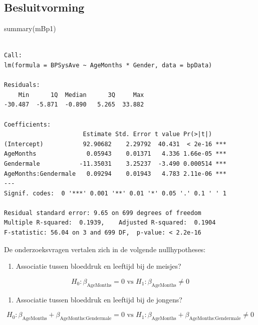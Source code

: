 \documentclass[
  dutch,
  letterpaper,
  12pt]{book}
\newenvironment{Shaded}{\begin{snugshade}}{\end{snugshade}}
\newcommand{\FunctionTok}[1]{\textcolor[rgb]{0.28,0.35,0.67}{#1}}
\newcommand{\NormalTok}[1]{\textcolor[rgb]{0.00,0.23,0.31}{#1}}
\providecommand{\tightlist}{%
  \setlength{\itemsep}{0pt}\setlength{\parskip}{0pt}}
\theoremstyle{definition}
\theoremstyle{definition}
\theoremstyle{definition}
\theoremstyle{remark}
\begin{document}
\subsection{Besluitvorming}\label{besluitvorming}

\begin{Shaded}
\begin{Highlighting}[]
\FunctionTok{summary}\NormalTok{(mBp1)}
\end{Highlighting}
\end{Shaded}

\begin{verbatim}

Call:
lm(formula = BPSysAve ~ AgeMonths * Gender, data = bpData)

Residuals:
    Min      1Q  Median      3Q     Max 
-30.487  -5.871  -0.890   5.265  33.882 

Coefficients:
                      Estimate Std. Error t value Pr(>|t|)    
(Intercept)           92.90682    2.29792  40.431  < 2e-16 ***
AgeMonths              0.05943    0.01371   4.336 1.66e-05 ***
Gendermale           -11.35031    3.25237  -3.490 0.000514 ***
AgeMonths:Gendermale   0.09294    0.01943   4.783 2.11e-06 ***
---
Signif. codes:  0 '***' 0.001 '**' 0.01 '*' 0.05 '.' 0.1 ' ' 1

Residual standard error: 9.65 on 699 degrees of freedom
Multiple R-squared:  0.1939,    Adjusted R-squared:  0.1904 
F-statistic: 56.04 on 3 and 699 DF,  p-value: < 2.2e-16
\end{verbatim}

De onderzoeksvragen vertalen zich in de volgende nullhypotheses:

\begin{enumerate}
\def\labelenumi{\arabic{enumi}.}
\tightlist
\item
  Associatie tussen bloeddruk en leeftijd bij de meisjes?
\end{enumerate}

\[
H_0: \beta_\text{AgeMonths} = 0 \text{ vs } H_1: \beta_\text{AgeMonths} \neq 0
\]

\begin{enumerate}
\def\labelenumi{\arabic{enumi}.}
\setcounter{enumi}{1}
\tightlist
\item
  Associatie tussen bloeddruk en leeftijd bij de jongens?
\end{enumerate}

\[
H_0: \beta_\text{AgeMonths} + \beta_\text{AgeMonths:Gendermale} = 0 \text{ vs } H_1: \beta_\text{AgeMonths} + \beta_\text{AgeMonths:Gendermale} \neq 0
\]
\end{document}
